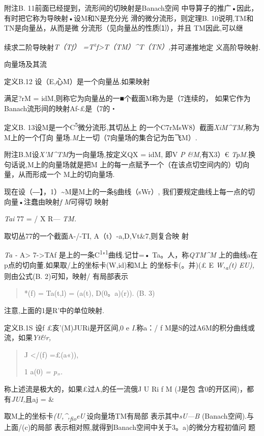 \documentclass{article}
\begin{document}
附注B. 11前面已经提到，流形间的切映射是Banach空间
中导算子的推广•因此，有时把它称为导映射•设M和N是充分光
滑的微分流形，则定理B. 10说明,TM和TN是向量丛，从而是微
分流形（见向量丛的性质⑴），并且 TM因此,可以继

续求二阶导映射\emph{T（Tf）
=T\textsuperscript{z}f\textgreater{}T（TM）\^{}T（TN）,}并可递推地定
义高阶导映射.

向量场及其流

定义B.12 设（E,心M）是一个向量丛.如果映射

满足?rM = idM,则称它为向量丛的一■个截面M称为是（7连续的，
如果它作为Banach流形间的映射Af-£是（7的・

定义B. 13设M是一个C\textsuperscript{5}微分流形,其切丛上
的一个C7rMsW8）截面\emph{XiM\^{}TM,}称为M上的一个仃向
量场.\emph{M}上一切（7向量场的集合记为缶飞M）.

附注B.M设\emph{X'M\^{}TM}为一向量场,按定义QX = idM, 即V \emph{P
\&M,}有X3）€ \emph{TpM.}换句话说,M上的向量场就是把M
上的每一点赋予一个（在该点切空间内的）切向量，从而形成一个
M上的切向量场.

现在设（―】，1）\textasciitilde{}M是M上的一条§曲线（sWr）,
我们要规定曲线上每一点的切向量•注蠢由映射\emph{f M}可得切 映射

\emph{Tai} 77 = / X R--- \emph{TM.}

取切丛77的一个截面A-/-TI, A（t）-a,D,Vt\&7,则复合映 射

\emph{Ta -} A\textgreater{} 7-\textgreater{}TAf
是上的一条C\textsuperscript{1}"\textsuperscript{1}曲线.记廿=•
Ta。人，称\emph{QTM\^{}M}
上的曲线a在p点的切向董.如果取/上的坐标卡(W,id)和M上 的坐标卡(。并)(£ E
\emph{W,\textsubscript{a}(t) EU),}则由公式(B. 2)可知，映射/ 有局部表示

\begin{quote}
*(f) = Ta(t,l) = (a(t), D(0。a)(r)). (B. 3)
\end{quote}

注意,上面的1是R'中的单位映射.

定义B.1S 设f £亥'(M)JURi是开区间,0 e \emph{I.}称a：/ f
M是S的过A6M的积分曲线或流，如果\emph{Yt\&r,}

\begin{quote}
J \textless{}/(f) =£(a«)),

1 a(0) \emph{= p„.}
\end{quote}

称上述流是极大的，如果£过A,的任一流俄J U Ri f M (J是包
含0的开区间)，都有\emph{JUI,}且a\textbar{}j = \&

取M上的坐标卡\emph{(U,\^{},\textsubscript{fio}eU\textsubscript{,}}设向量场TM有局部
表示其中\emph{sU---B} (Banach空间).与上面/(c)的局部
表示相对照,就得到Banach空间中关于3。a)的微分方程初值问 题
\end{document}
